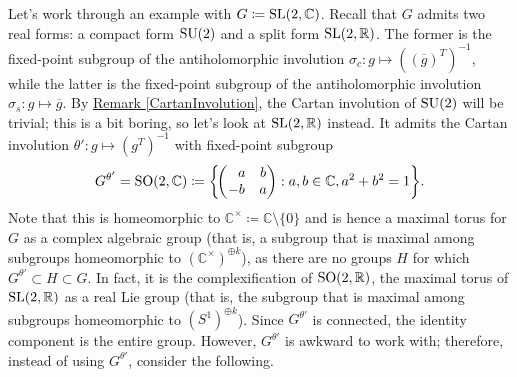 \noindent\begin{example} %
Let's work through an example with $G \coloneqq \textnormal{SL}(2, \mathbb{C})$. Recall that $G$ admits two real forms: a compact form $\textnormal{SU}(2)$ and a split form $\textnormal{SL}(2, \mathbb{R})$. The former is the fixed-point subgroup of the antiholomorphic involution $\sigma_c : g \mapsto ((\overline{g})^T)^{-1}$, while the latter is the fixed-point subgroup of the antiholomorphic involution $\sigma_s : g \mapsto \overline{g}$. By \hyperref[CartanInvolution]{Remark \ref*{CartanInvolution}}, the Cartan involution of $\textnormal{SU}(2)$ will be trivial; this is a bit boring, so let's look at $\textnormal{SL}(2, \mathbb{R})$ instead. It admits the Cartan involution $\theta' : g \mapsto (g^T)^{-1}$ with fixed-point subgroup
\begin{align*}
\begin{split}
G^{\theta'} = \textnormal{SO}(2, \mathbb{C}) \coloneqq \left\{\!\begin{pmatrix}\hphantom{-}a&b\\-b&a\end{pmatrix} : a, b \in \mathbb{C}, a^2 + b^2 = 1\right\}\!.
\end{split}
\end{align*}
\noindent Note that this is homeomorphic to $\mathbb{C}^\times \coloneqq \mathbb{C}\!\setminus\!\{0\}$ and is hence a maximal torus for $G$ as a complex algebraic group (that is, a subgroup that is maximal among subgroups homeomorphic to $(\mathbb{C}^\times)^{\oplus k}$), as there are no groups $H$ for which $G^{\theta'} \subset H \subset G$. In fact, it is the complexification of $\textnormal{SO}(2, \mathbb{R})$, the maximal torus of $\textnormal{SL}(2, \mathbb{R})$ as a real Lie group (that is, the subgroup that is maximal among subgroups homeomorphic to $(S^1)^{\oplus k}$). Since $G^{\theta'}$ is connected, the identity component is the entire group. However, $G^{\theta'}$ is awkward to work with; therefore, instead of using $G^{\theta'}$, consider the following.\newpage


\end{example}
